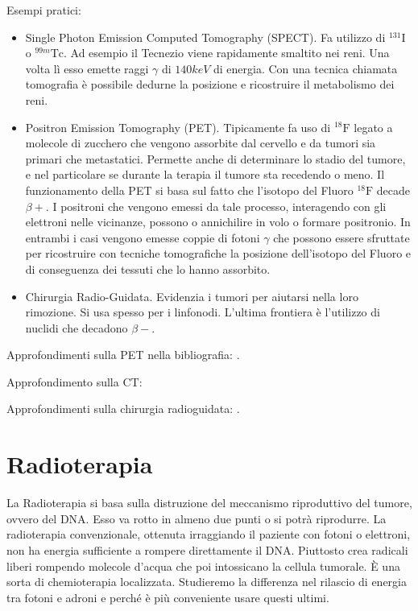  Esempi pratici:
\begin{itemize}
\item Single Photon Emission Computed Tomography (SPECT). Fa utilizzo di $^{131}\text{I}$ o $^{99m}\text{Tc}$. Ad esempio il Tecnezio viene rapidamente smaltito nei reni. Una volta lì esso emette raggi $\gamma$ di $140 keV$ di energia. Con una tecnica chiamata tomografia è possibile dedurne la posizione e ricostruire il metabolismo dei reni.
\item Positron Emission Tomography (PET). Tipicamente fa uso di $^{18}\text{F}$ legato a molecole di zucchero che vengono assorbite dal cervello e da tumori sia primari che metastatici. Permette anche di determinare lo stadio del tumore, e nel particolare se durante la terapia il tumore sta recedendo o meno. Il funzionamento della PET si basa sul fatto che l'isotopo del Fluoro $^{18}\text{F}$ decade $\beta+$. I positroni che vengono emessi da tale processo, interagendo con gli elettroni nelle vicinanze, possono o annichilire in volo o formare positronio. In entrambi i casi vengono emesse coppie di fotoni $\gamma$ che possono essere sfruttate per ricostruire con tecniche tomografiche la posizione dell'isotopo del Fluoro e di conseguenza dei tessuti che lo hanno assorbito.
\item Chirurgia Radio-Guidata. Evidenzia i tumori per aiutarsi nella loro rimozione. Si usa spesso per i linfonodi. L'ultima frontiera è l'utilizzo di nuclidi che decadono $\beta-$.
\end{itemize}

Approfondimenti sulla PET nella bibliografia: \cite{PET1} \cite{PET2}.

Approfondimento sulla CT: \cite{CT}

Approfondimenti sulla chirurgia radioguidata: \cite{Radiosurgery} \cite{Intraoperative_probes}.

\section{Radioterapia}

La Radioterapia si basa sulla distruzione del meccanismo riproduttivo del tumore, ovvero del DNA. Esso va rotto in almeno due punti o si potrà riprodurre. La radioterapia convenzionale, ottenuta irraggiando il paziente con fotoni o elettroni, non ha energia sufficiente a rompere direttamente il DNA. Piuttosto crea radicali liberi rompendo molecole d'acqua che poi intossicano la cellula tumorale. \`E una sorta di chemioterapia localizzata. Studieremo la differenza nel rilascio di energia tra fotoni e adroni e perché è più conveniente usare questi ultimi.

